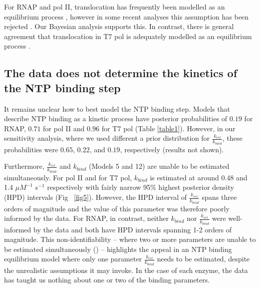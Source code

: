 \documentclass[10pt,letterpaper]{article}
\begin{document}
For RNAP and pol II, translocation has frequently been modelled as an equilibrium process \cite{abbondanzieri2005direct, bai2004sequence, mejia2015trigger, larson2012trigger, schweikhard2014transcription}, however in some recent analyses this assumption has been rejected \cite{tadigotla2006thermodynamic, maoileidigh2011unified, nedialkov2012rna, Dangkulwanich2013complete, kireeva2018rna}. Our Bayesian analysis supports this. In contrast, there is general agreement that translocation in T7 pol is adequately modelled as an equilibrium process \cite{guajardo1998ntp, arnold2001kinetic, thomen2008t7}. \par





\subsection*{The data does not determine the kinetics of the NTP binding step}





It remains unclear how to best model the NTP binding step. Models that describe NTP binding as a kinetic process have posterior probabilities of $0.19$ for RNAP, $0.71$ for pol II and $0.96$ for T7 pol (Table \ref{table1}). However, in our sensitivity analysis, where we used different a prior distribution for $\frac{k_{rel}}{k_{bind}}$, these probabilities were $0.65$, $0.22$, and $0.19$, respectively (results not shown).


Furthermore, $\frac{k_{rel}}{k_{bind}}$ and $k_{bind}$ (Models 5 and 12) are unable to be estimated simultaneously. For pol II and for T7 pol, $k_{bind}$ is estimated at around 0.48 and 1.4 $\mu M^{-1}$ s$^{-1}$ respectively with fairly narrow 95\% highest posterior density (HPD) intervals (Fig ~\ref{fig5}). However, the HPD interval of $\frac{k_{rel}}{k_{bind}}$ spans three orders of magnitude and the value of this parameter was therefore poorly informed by the data. For RNAP, in contrast, neither $k_{bind}$ nor $\frac{k_{rel}}{k_{bind}}$ were well-informed by the data and both have HPD intervals spanning 1-2 orders of magnitude. This non-identifiability -- where two or more parameters are unable to be estimated simultaneously () -- highlights the appeal in an NTP binding equilibrium model where only one parameter $\frac{k_{rel}}{k_{bind}}$ needs to be estimated, despite the unrealistic assumptions it may invoke. In the case of each enzyme, the data has taught us nothing about one or two of the binding parameters.
\end{document}
